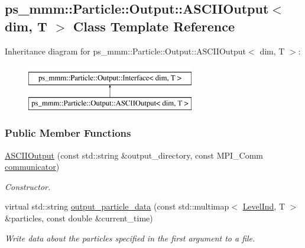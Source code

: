 \hypertarget{classps__mmm_1_1_particle_1_1_output_1_1_a_s_c_i_i_output}{}\subsection{ps\+\_\+mmm\+:\+:Particle\+:\+:Output\+:\+:A\+S\+C\+I\+I\+Output$<$ dim, T $>$ Class Template Reference}
\label{classps__mmm_1_1_particle_1_1_output_1_1_a_s_c_i_i_output}
Inheritance diagram for ps\+\_\+mmm\+:\+:Particle\+:\+:Output\+:\+:A\+S\+C\+I\+I\+Output$<$ dim, T $>$\+:\begin{figure}[H]
\begin{center}
\leavevmode
\includegraphics[height=2.000000cm]{classps__mmm_1_1_particle_1_1_output_1_1_a_s_c_i_i_output}
\end{center}
\end{figure}
\subsubsection*{Public Member Functions}
\begin{DoxyCompactItemize}
\item 
\hyperlink{classps__mmm_1_1_particle_1_1_output_1_1_a_s_c_i_i_output_a4e08cc2347aa7aa3e1bd472b0f98bc8b}{A\+S\+C\+I\+I\+Output} (const std\+::string \&output\+\_\+directory, const M\+P\+I\+\_\+\+Comm \hyperlink{classps__mmm_1_1_particle_1_1_output_1_1_interface_ae3fcfd82092c40864ec09918f03b91d0}{communicator})
\begin{DoxyCompactList}\small\item\em Constructor. \end{DoxyCompactList}\item 
virtual std\+::string \hyperlink{classps__mmm_1_1_particle_1_1_output_1_1_a_s_c_i_i_output_abe91e926cc3c6e71f0b6011652b23113}{output\+\_\+particle\+\_\+data} (const std\+::multimap$<$ \hyperlink{namespaceps__mmm_1_1_particle_a475174140997ceb63cc9e801b6c0c4b8}{Level\+Ind}, T $>$ \&particles, const double \&current\+\_\+time)
\begin{DoxyCompactList}\small\item\em Write data about the particles specified in the first argument to a file. \end{DoxyCompactList}\end{DoxyCompactItemize}

